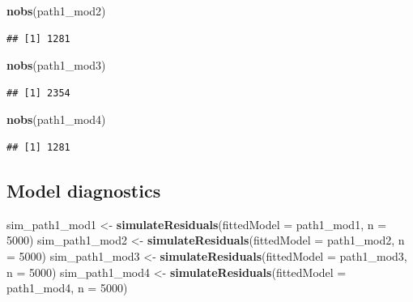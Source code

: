 \documentclass[
]{article}
\newenvironment{Shaded}{\begin{snugshade}}{\end{snugshade}}
\newcommand{\DataTypeTok}[1]{\textcolor[rgb]{0.13,0.29,0.53}{#1}}
\newcommand{\DecValTok}[1]{\textcolor[rgb]{0.00,0.00,0.81}{#1}}
\newcommand{\KeywordTok}[1]{\textcolor[rgb]{0.13,0.29,0.53}{\textbf{#1}}}
\newcommand{\NormalTok}[1]{#1}
\newcommand{\StringTok}[1]{\textcolor[rgb]{0.31,0.60,0.02}{#1}}
\begin{document}
\begin{Shaded}
\begin{Highlighting}[]
\KeywordTok{nobs}\NormalTok{(path1\_mod2)}
\end{Highlighting}
\end{Shaded}

\begin{verbatim}
## [1] 1281
\end{verbatim}

\begin{Shaded}
\begin{Highlighting}[]
\KeywordTok{nobs}\NormalTok{(path1\_mod3)}
\end{Highlighting}
\end{Shaded}

\begin{verbatim}
## [1] 2354
\end{verbatim}

\begin{Shaded}
\begin{Highlighting}[]
\KeywordTok{nobs}\NormalTok{(path1\_mod4)}
\end{Highlighting}
\end{Shaded}

\begin{verbatim}
## [1] 1281
\end{verbatim}

\hypertarget{model-diagnostics}{%
\subsection{Model diagnostics}\label{model-diagnostics}}

\begin{Shaded}
\begin{Highlighting}[]
\NormalTok{sim\_path1\_mod1 \textless{}{-}}\StringTok{ }\KeywordTok{simulateResiduals}\NormalTok{(}\DataTypeTok{fittedModel =}\NormalTok{ path1\_mod1, }\DataTypeTok{n =} \DecValTok{5000}\NormalTok{) }
\NormalTok{sim\_path1\_mod2 \textless{}{-}}\StringTok{ }\KeywordTok{simulateResiduals}\NormalTok{(}\DataTypeTok{fittedModel =}\NormalTok{ path1\_mod2, }\DataTypeTok{n =} \DecValTok{5000}\NormalTok{) }
\NormalTok{sim\_path1\_mod3 \textless{}{-}}\StringTok{ }\KeywordTok{simulateResiduals}\NormalTok{(}\DataTypeTok{fittedModel =}\NormalTok{ path1\_mod3, }\DataTypeTok{n =} \DecValTok{5000}\NormalTok{) }
\NormalTok{sim\_path1\_mod4 \textless{}{-}}\StringTok{ }\KeywordTok{simulateResiduals}\NormalTok{(}\DataTypeTok{fittedModel =}\NormalTok{ path1\_mod4, }\DataTypeTok{n =} \DecValTok{5000}\NormalTok{) }
\end{Highlighting}
\end{Shaded}
\end{document}
